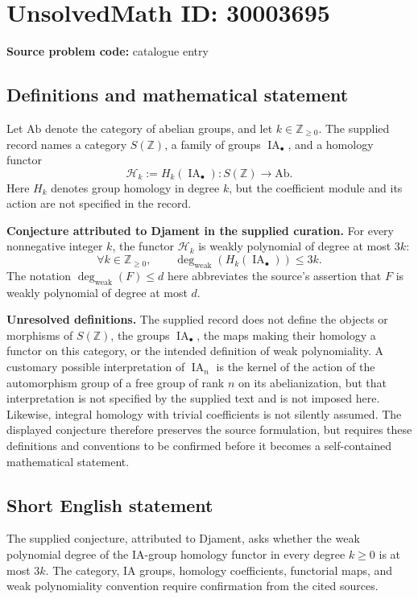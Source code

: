 \documentclass[11pt]{article}
\newcommand{\Z}{\mathbb{Z}}
\begin{document}
\section*{UnsolvedMath ID: 30003695}
\textbf{Source problem code:} catalogue entry
\subsection{Definitions and mathematical statement}
Let \(\mathrm{Ab}\) denote the category of abelian groups, and let \(k\in\Z_{\geq 0}\). The supplied record names a category \(S(\Z)\), a family of groups \(\operatorname{IA}_{\bullet}\), and a homology functor
\[
\mathcal H_k:=H_k(\operatorname{IA}_{\bullet})\colon S(\Z)\longrightarrow\mathrm{Ab}.
\]
Here \(H_k\) denotes group homology in degree \(k\), but the coefficient module and its action are not specified in the record.

\textbf{Conjecture attributed to Djament in the supplied curation.} For every nonnegative integer \(k\), the functor \(\mathcal H_k\) is weakly polynomial of degree at most \(3k\):
\[
\forall k\in\Z_{\geq 0},\qquad
\deg_{\mathrm{weak}}\!\left(H_k(\operatorname{IA}_{\bullet})\right)\leq 3k.
\]
The notation \(\deg_{\mathrm{weak}}(F)\leq d\) here abbreviates the source's assertion that \(F\) is weakly polynomial of degree at most \(d\).

\textbf{Unresolved definitions.} The supplied record does not define the objects or morphisms of \(S(\Z)\), the groups \(\operatorname{IA}_{\bullet}\), the maps making their homology a functor on this category, or the intended definition of weak polynomiality. A customary possible interpretation of \(\operatorname{IA}_n\) is the kernel of the action of the automorphism group of a free group of rank \(n\) on its abelianization, but that interpretation is not specified by the supplied text and is not imposed here. Likewise, integral homology with trivial coefficients is not silently assumed. The displayed conjecture therefore preserves the source formulation, but requires these definitions and conventions to be confirmed before it becomes a self-contained mathematical statement.
\subsection{Short English statement}
The supplied conjecture, attributed to Djament, asks whether the weak polynomial degree of the IA-group homology functor in every degree \(k\geq 0\) is at most \(3k\). The category, IA groups, homology coefficients, functorial maps, and weak polynomiality convention require confirmation from the cited sources.
\end{document}
